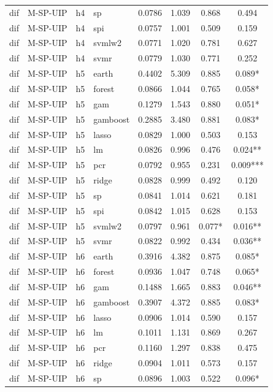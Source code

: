 \begin{ThreePartTable}
\begin{longtable}[t]{llclcccc}
dif & M-SP-UIP & h4 & sp & 0.0786 & 1.039 & 0.868 & 0.494\\
dif & M-SP-UIP & h4 & spi & 0.0757 & 1.001 & 0.509 & 0.159\\
dif & M-SP-UIP & h4 & svmlw2 & 0.0771 & 1.020 & 0.781 & 0.627\\
dif & M-SP-UIP & h4 & svmr & 0.0779 & 1.030 & 0.771 & 0.252\\
\addlinespace
dif & M-SP-UIP & h5 & earth & 0.4402 & 5.309 & 0.885 & 0.089*\\
dif & M-SP-UIP & h5 & forest & 0.0866 & 1.044 & 0.765 & 0.058*\\
dif & M-SP-UIP & h5 & gam & 0.1279 & 1.543 & 0.880 & 0.051*\\
dif & M-SP-UIP & h5 & gamboost & 0.2885 & 3.480 & 0.881 & 0.083*\\
dif & M-SP-UIP & h5 & lasso & 0.0829 & 1.000 & 0.503 & 0.153\\
dif & M-SP-UIP & h5 & lm & 0.0826 & 0.996 & 0.476 & 0.024**\\
dif & M-SP-UIP & h5 & pcr & 0.0792 & 0.955 & 0.231 & 0.009***\\
dif & M-SP-UIP & h5 & ridge & 0.0828 & 0.999 & 0.492 & 0.120\\
dif & M-SP-UIP & h5 & sp & 0.0841 & 1.014 & 0.621 & 0.181\\
dif & M-SP-UIP & h5 & spi & 0.0842 & 1.015 & 0.628 & 0.153\\
dif & M-SP-UIP & h5 & svmlw2 & 0.0797 & 0.961 & 0.077* & 0.016**\\
dif & M-SP-UIP & h5 & svmr & 0.0822 & 0.992 & 0.434 & 0.036**\\
\addlinespace
dif & M-SP-UIP & h6 & earth & 0.3916 & 4.382 & 0.875 & 0.085*\\
dif & M-SP-UIP & h6 & forest & 0.0936 & 1.047 & 0.748 & 0.065*\\
dif & M-SP-UIP & h6 & gam & 0.1488 & 1.665 & 0.883 & 0.046**\\
dif & M-SP-UIP & h6 & gamboost & 0.3907 & 4.372 & 0.885 & 0.083*\\
dif & M-SP-UIP & h6 & lasso & 0.0906 & 1.014 & 0.590 & 0.157\\
dif & M-SP-UIP & h6 & lm & 0.1011 & 1.131 & 0.869 & 0.267\\
dif & M-SP-UIP & h6 & pcr & 0.1160 & 1.297 & 0.838 & 0.475\\
dif & M-SP-UIP & h6 & ridge & 0.0904 & 1.011 & 0.573 & 0.157\\
dif & M-SP-UIP & h6 & sp & 0.0896 & 1.003 & 0.522 & 0.096*\\

\end{longtable}
\end{ThreePartTable}
